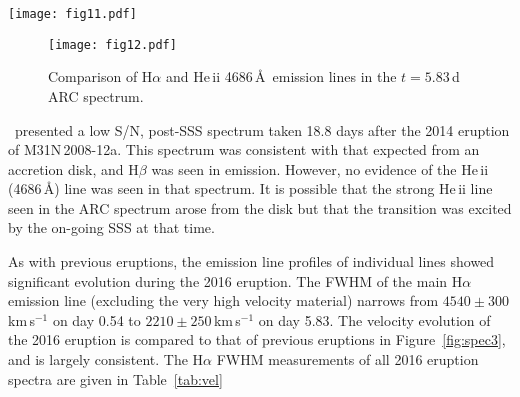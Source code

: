 \documentclass[twocolumn,tighten]{aastex6}
\def\novak{{M31N\,2008-12a}}
\newcommand{\hstphot}{\citetalias{2017ApJ...849...96D}}
\begin{document}
\begin{figure*}
\texttt{[image: fig11.pdf]}
\caption{ARC spectra of the 2016 eruption of \novak\ taken 0.82 and 1.80\,d post-eruption (top) and 5.83\,d post-eruption (bottom). The bottom panel shows a smaller wavelength range than the top panel, and here the gray line represents the errors for the $t=5.83$\,d spectrum.\label{fig:apo}}
\end{figure*}

\begin{figure}
\texttt{[image: fig12.pdf]}
\caption{Comparison of H$\alpha$ and He\,{\sc ii} 4686\,\AA\ emission lines in the $t=5.83$\,d ARC spectrum.\label{fig:apovel}}
\end{figure}

\hstphot\ presented a low S/N, post-SSS spectrum taken 18.8 days after the 2014 eruption of \novak.  This spectrum was consistent with that expected from an accretion disk, and H$\beta$ was seen in emission.  However, no evidence of the He\,{\sc ii} (4686\,\AA) line was seen in that spectrum.  It is possible that the strong He\,{\sc ii} line seen in the ARC spectrum arose from the disk but that the transition was excited by the on-going SSS at that time.

As with previous eruptions, the emission line profiles of individual lines showed significant evolution during the 2016 eruption. The FWHM of the main H$\alpha$ emission line (excluding the very high velocity material) narrows from $4540\pm300$\,km\,s$^{-1}$ on day 0.54 to $2210\pm250$\,km\,s$^{-1}$ on day 5.83. The velocity evolution of the 2016 eruption is compared to that of previous eruptions in Figure~\ref{fig:spec3}, and is largely consistent. The H$\alpha$ FWHM measurements of all 2016 eruption spectra are given in Table~\ref{tab:vel}
\end{document}
